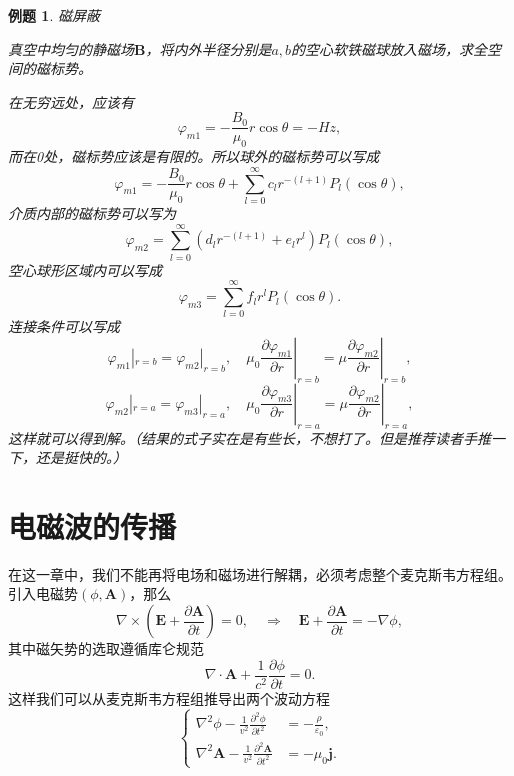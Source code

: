 \documentclass[UTF8]{ctexbook}
\renewcommand{\b}{\boldsymbol}
\newtheorem{eg}{例题}
\numberwithin{equation}{chapter}
\begin{document}
	\begin{eg}
		磁屏蔽
		\begin{figure}[H]
			\centering
		\end{figure}
		真空中均匀的静磁场$\b{B}$，将内外半径分别是$a,b$的空心软铁磁球放入磁场，求全空间的磁标势。
		
		在无穷远处，应该有
		\[\varphi_{m1}=-\frac{B_0}{\mu_0}r\cos\theta = -Hz,\]
		而在0处，磁标势应该是有限的。所以球外的磁标势可以写成
		\[\varphi_{m1}=-\frac{B_0}{\mu_0}r\cos\theta+\sum_{l=0}^\infty c_lr^{-(l+1)}P_l(\cos\theta),\]
		介质内部的磁标势可以写为
		\[\varphi_{m2}=\sum_{l=0}^\infty (d_lr^{-(l+1)}+e_lr^l)P_l(\cos\theta),\]
		空心球形区域内可以写成
		\[\varphi_{m3}=\sum_{l=0}^\infty f_lr^lP_l(\cos\theta).\]
		连接条件可以写成
		\[\varphi_{m1}|_{r=b}=\varphi_{m2}|_{r=b},\quad \mu_0\left.\frac{\partial \varphi_{m1}}{\partial r}\right|_{r=b}=\mu\left.\frac{\partial \varphi_{m2}}{\partial r}\right|_{r=b},\]
		\[\varphi_{m2}|_{r=a}=\varphi_{m3}|_{r=a},\quad \mu_0\left.\frac{\partial \varphi_{m3}}{\partial r}\right|_{r=a}=\mu\left.\frac{\partial \varphi_{m2}}{\partial r}\right|_{r=a},\]
		这样就可以得到解。（结果的式子实在是有些长，不想打了。但是推荐读者手推一下，还是挺快的。）
	\end{eg}
	
	\chapter{电磁波的传播}
	在这一章中，我们不能再将电场和磁场进行解耦，必须考虑整个麦克斯韦方程组。引入电磁势$(\phi,\b{A})$，那么
	\[\nabla\times\left(\b{E}+\frac{\partial \b{A}}{\partial t}\right)=0,\quad \Rightarrow \quad \b{E}+\frac{\partial \b{A}}{\partial t}=-\nabla\phi,\]
	其中磁矢势的选取遵循库仑规范
	\[\nabla\cdot\b{A}+\frac{1}{c^2}\frac{\partial \phi}{\partial t}=0.\]
	这样我们可以从麦克斯韦方程组推导出两个波动方程
	\[\left\{\begin{aligned}
		\nabla^2\phi-\frac{1}{v^2}\frac{\partial^2 \phi}{\partial t^2}&=-\frac{\rho}{\varepsilon_0}, \\
		\nabla^2\b{A}-\frac{1}{v^2}\frac{\partial^2 \b{A}}{\partial t^2}&=-\mu_0\b{j}.
	\end{aligned}\right.\]
	
\end{document}
